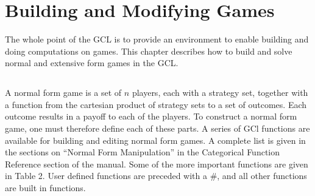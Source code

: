 \chapter{Building and Modifying Games}

The whole point of the GCL is to provide an environment to enable
building and doing computations on games.  This chapter describes how
to build and solve normal and extensive form games in the GCL.  

\section{}

A normal form game is a set of $n$ players, each with a strategy
set, together with a function from the cartesian product of strategy
sets to a set of outcomes. Each outcome results in a payoff to each of
the players.  To construct a normal form game, one must therefore
define each of these parts.  A series of GCl functions are available
for building and editing normal form games.  A complete list is given
in the sections on ``Normal Form Manipulation'' in the Categorical
Function Reference section of the manual.  Some of the more important
functions are given in Table 2.  User defined functions are preceded
with a \#, and all other functions are built in functions.  

